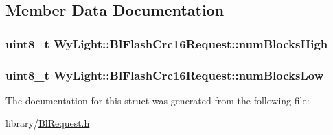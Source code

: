\subsection{Member Data Documentation}
\hypertarget{struct_wy_light_1_1_bl_flash_crc16_request_a336dd15d053c5e7330a638de12141b35}{
\subsubsection[{num\-Blocks\-High}]{\setlength{\rightskip}{0pt plus 5cm}uint8\-\_\-t Wy\-Light\-::\-Bl\-Flash\-Crc16\-Request\-::num\-Blocks\-High}}\label{struct_wy_light_1_1_bl_flash_crc16_request_a336dd15d053c5e7330a638de12141b35}
\hypertarget{struct_wy_light_1_1_bl_flash_crc16_request_ae203ed160c58cf31e6395fd3c1e7560b}{
\subsubsection[{num\-Blocks\-Low}]{\setlength{\rightskip}{0pt plus 5cm}uint8\-\_\-t Wy\-Light\-::\-Bl\-Flash\-Crc16\-Request\-::num\-Blocks\-Low}}\label{struct_wy_light_1_1_bl_flash_crc16_request_ae203ed160c58cf31e6395fd3c1e7560b}


The documentation for this struct was generated from the following file\-:\begin{DoxyCompactItemize}
\item 
library/\hyperlink{_bl_request_8h}{Bl\-Request.\-h}\end{DoxyCompactItemize}
